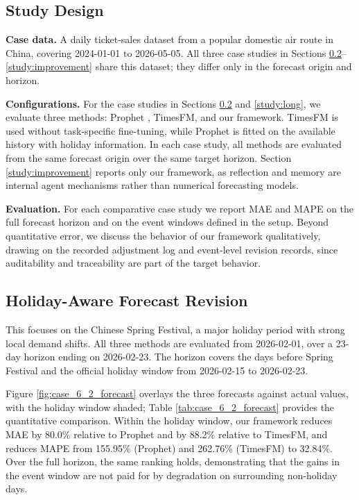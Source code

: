 \documentclass{article}
\theoremstyle{plain}
\theoremstyle{definition}
\theoremstyle{remark}
\begin{document}
\subsection{Study Design}
\textbf{Case data.} A daily ticket-sales dataset from a popular domestic air route in China, covering 2024-01-01 to 2026-05-05. All three case studies in Sections \ref{study:holiday}–\ref{study:improvement} share this dataset; they differ only in the forecast origin and horizon.

\textbf{Configurations.} For the case studies in Sections \ref{study:holiday} and \ref{study:long}, we evaluate three methods: Prophet \cite{taylor2018forecasting}, TimesFM, and our framework. TimesFM is used without task-specific fine-tuning, while Prophet is fitted on the available history with holiday information. In each case study, all methods are evaluated from the same forecast origin over the same target horizon. Section \ref{study:improvement} reports only our framework, as reflection and memory are internal agent mechanisms rather than numerical forecasting models.

\textbf{Evaluation.} For each comparative case study we report MAE and MAPE on the full forecast horizon and on the event windows defined in the setup. Beyond quantitative error, we discuss the behavior of our framework qualitatively, drawing on the recorded adjustment log and event-level revision records, since auditability and traceability are part of the target behavior.

\subsection{Holiday-Aware Forecast Revision}\label{study:holiday}
This focuses on the Chinese Spring Festival, a major holiday period with strong local demand shifts. All three methods are evaluated from 2026-02-01, over a 23-day horizon ending on 2026-02-23. The horizon covers the days before Spring Festival and the official holiday window from 2026-02-15 to 2026-02-23.

Figure \ref{fig:case_6_2_forecast} overlays the three forecasts against actual values, with the holiday window shaded; Table \ref{tab:case_6_2_forecast} provides the quantitative comparison. Within the holiday window, our framework reduces MAE by 80.0\% relative to Prophet and by 88.2\% relative to TimesFM, and reduces MAPE from 155.95\% (Prophet) and 262.76\% (TimesFM) to 32.84\%. Over the full horizon, the same ranking holds, demonstrating that the gains in the event window are not paid for by degradation on surrounding non-holiday days.
\end{document}
